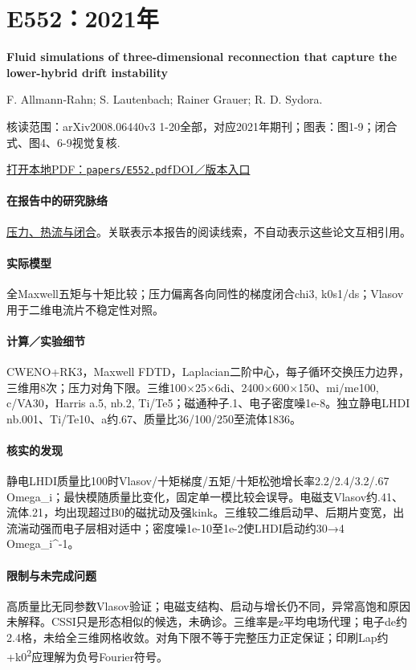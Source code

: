 \section{E552：2021年}\label{paper:E552}

\textbf{Fluid simulations of three-dimensional reconnection that capture the lower-hybrid drift instability}\citep{E552}\

F. Allmann‐Rahn;  S. Lautenbach;  Rainer Grauer;  R. D. Sydora.

\textsf{核读范围：}arXiv2008.06440v3 1-20全部，对应2021年期刊；\textsf{图表：}图1-9；闭合式、图4、6-9视觉复核.

\href{run:papers/E552.pdf}{打开本地PDF：\texttt{papers/E552.pdf}}\quad\href{https://doi.org/10.1017/s0022377820001683}{DOI／版本入口}

\paragraph{在报告中的研究脉络}\hyperref[story:closure]{压力、热流与闭合}。关联表示本报告的阅读线索，不自动表示这些论文互相引用。

\paragraph{实际模型}全Maxwell五矩与十矩比较；压力偏离各向同性的梯度闭合chi3, k0s1/ds；Vlasov用于二维电流片不稳定性对照。

\paragraph{计算／实验细节}CWENO+RK3，Maxwell FDTD，Laplacian二阶中心，每子循环交换压力边界，三维用8次；压力对角下限。三维100×25×6di、2400×600×150、mi/me100, c/VA30，Harris a.5, nb.2, Ti/Te5；磁通种子.1、电子密度噪1e-8。独立静电LHDI nb.001、Ti/Te10、a约.67、质量比36/100/250至流体1836。

\paragraph{核实的发现}静电LHDI质量比100时Vlasov/十矩梯度/五矩/十矩松弛增长率2.2/2.4/3.2/.67 Omega\_i；最快模随质量比变化，固定单一模比较会误导。电磁支Vlasov约.41、流体.21，均出现超过B0的磁扰动及强kink。三维较二维启动早、后期片变宽，出流湍动强而电子层相对适中；密度噪1e-10至1e-2使LHDI启动约30→4 Omega\_i\textasciicircum{}-1。

\paragraph{限制与未完成问题}高质量比无同参数Vlasov验证；电磁支结构、启动与增长仍不同，异常高饱和原因未解释。CSSI只是形态相似的候选，未确诊。三维率是z平均电场代理；电子de约2.4格，未给全三维网格收敛。对角下限不等于完整压力正定保证；印刷Lap约+k0\textsuperscript{2}应理解为负号Fourier符号。

